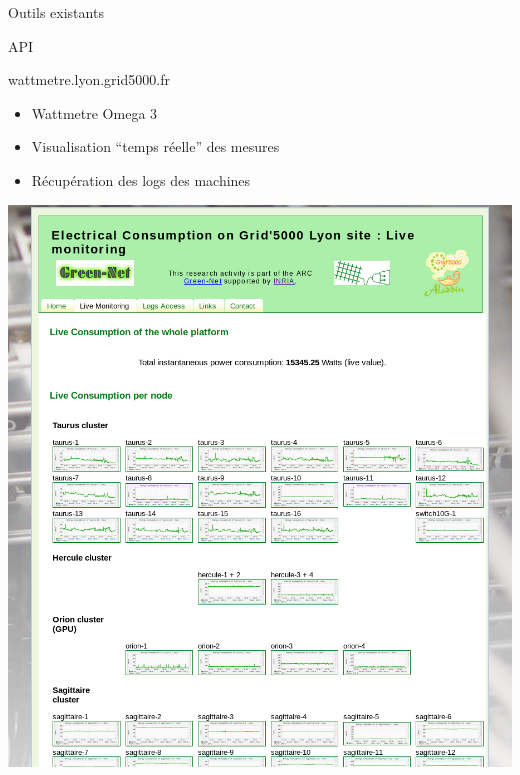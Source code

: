 \documentclass{beamer}
\begin{document}
\begin{frame}{Outils existants}

\begin{block}{API}

\end{block}

\begin{exampleblock}{wattmetre.lyon.grid5000.fr}
\begin{minipage}{0.77\linewidth}
\begin{itemize}
  \item Wattmetre Omega 3
  \item Visualisation ``temps réelle'' des mesures 
  \item Récupération des logs des machines 
\end{itemize}
\end{minipage}
\hfill
\begin{minipage}{0.17\linewidth}
\includegraphics[width=\linewidth]{live_monitoring.png}
\end{minipage}
\end{exampleblock}

\end{frame}
\end{document}
